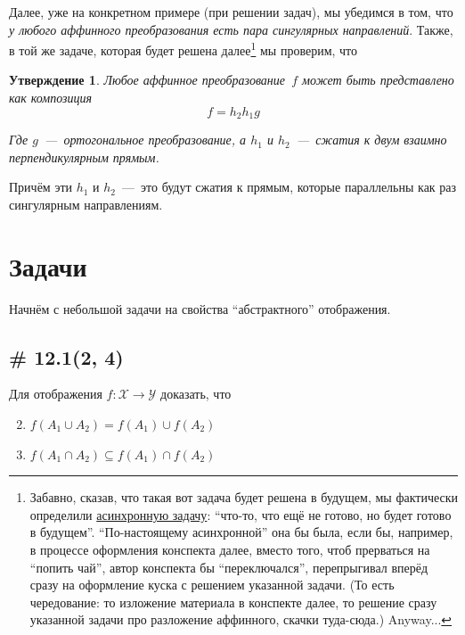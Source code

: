 \documentclass[a4paper,12pt]{article}
\newtheorem{proposition}{Утверждение}[section]
\begin{document}
  Далее, уже на конкретном примере (при решении задач), мы убедимся в том, что \emph{у любого аффинного преобразования есть пара сингулярных направлений}.
  Также, в той же задаче, которая будет решена далее\footnote{Забавно, сказав, что такая вот задача будет решена в будущем, мы фактически определили \href{https://docs.python.org/3/library/asyncio-future.html\#asyncio.Future}{асинхронную задачу}: ``что-то, что ещё не готово, но будет готово в будущем''. ``По-настоящему асинхронной'' она бы была, если бы, например, в процессе оформления конспекта далее, вместо того, чтоб прерваться на ``попить чай'', автор конспекта бы ``переключался'', перепрыгивал вперёд сразу на оформление куска с решением указанной задачи. (То есть чередование: то изложение материала в конспекте далее, то решение сразу указанной задачи про разложение аффинного, скачки туда-сюда.) Anyway...} мы проверим, что
  
  \begin{proposition}
    Любое аффинное преобразование~$f$ может быть представлено как композиция
    \[
      f = h_2 h_1 g
    \]
    
    Где $g$~---~ортогональное преобразование, а $h_1$ и $h_2$~---~сжатия к двум взаимно перпендикулярным прямым.
  \end{proposition}
  
  Причём эти $h_1$ и $h_2$~---~это будут сжатия к прямым, которые параллельны как раз сингулярным направлениям.
  
  
  \section{Задачи}
  
  Начнём с небольшой задачи на свойства ``абстрактного'' отображения.
  
  
  \subsection{\# 12.1(2, 4)}
  
  Для отображения $f\colon \mathcal X \to \mathcal Y$ доказать, что
  
  \begin{enumerate}
    \setcounter{enumi}{1}
    
    \item $f(A_1 \cup A_2) = f(A_1) \cup f(A_2)$
    
    \setcounter{enumi}{3}
    
    \item $f(A_1 \cap A_2) \subseteq f(A_1) \cap f(A_2)$
  \end{enumerate}
  
\end{document}
